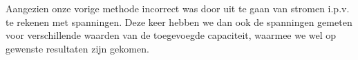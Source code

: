 \documentclass{article}
\begin{document}
Aangezien onze vorige methode incorrect was door uit te gaan van stromen i.p.v. te rekenen met spanningen. Deze keer hebben we dan ook de spanningen gemeten voor verschillende waarden van de toegevoegde capaciteit, waarmee we wel op gewenste resultaten zijn gekomen.
\end{document}
